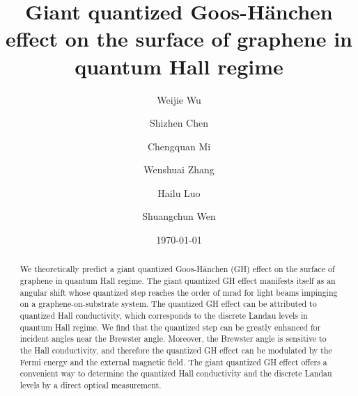 \documentclass[twocolumn,showpacs,preprintnumbers,amsmath,amssymb]{revtex4}
\begin{document}
\preprint{}

\title{Giant quantized Goos-H\"{a}nchen effect on the surface of graphene in quantum Hall regime}
\author{Weijie Wu}
\author{Shizhen Chen}
\author{Chengquan Mi}
\author{Wenshuai Zhang}
\author{Hailu Luo}
\author{Shuangchun Wen}
\date{\today}%

\begin{abstract}
We theoretically predict a giant quantized Goos-H\"{a}nchen (GH) effect on the surface of graphene in quantum Hall regime.
The giant quantized GH effect manifests itself as an angular shift whose quantized step reaches the order of
mrad for light beams impinging on a graphene-on-substrate system. The quantized GH effect can be attributed to quantized Hall conductivity, which corresponds to the discrete Landau levels in quantum Hall regime.
We find that the quantized step can be greatly enhanced for incident angles near the Brewster angle.
Moreover, the Brewster angle is sensitive to the Hall conductivity, and therefore the quantized GH effect
can be modulated by the Fermi energy and the external magnetic field.
The giant quantized GH effect offers a convenient way to determine
the quantized Hall conductivity and the discrete Landau levels by a direct optical
measurement.
\end{abstract}


\maketitle
\end{document}
